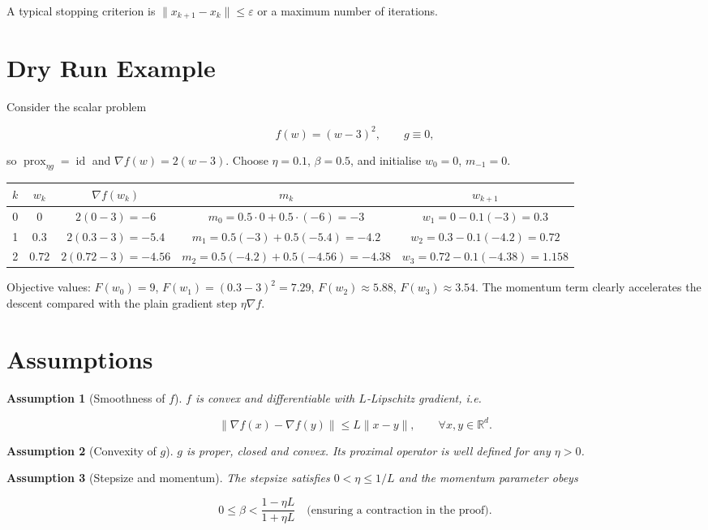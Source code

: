 \documentclass{article}
\newtheorem{assumption}{Assumption}
\newcommand{\prox}{\operatorname{prox}}
\newcommand{\R}{\mathbb{R}}
\begin{document}
A typical stopping criterion is $ \|x_{k+1}-x_{k}\|\leq \varepsilon$ or a maximum number of iterations.

\section*{Dry Run Example}
Consider the scalar problem  

\[
f(w)=(w-3)^{2},\qquad g\equiv0,
\]

so $\prox_{\eta g}= \operatorname{id}$ and $\nabla f(w)=2(w-3)$.  
Choose $\eta=0.1$, $\beta=0.5$, and initialise $w_{0}=0$, $m_{-1}=0$.

\begin{center}
\begin{tabular}{c|c|c|c|c}
$k$ & $w_{k}$ & $\nabla f(w_{k})$ & $m_{k}$ & $w_{k+1}$ \\ \hline
0 & $0$ & $2(0-3)=-6$ & $m_{0}=0.5\cdot0+0.5\cdot(-6)=-3$ & $w_{1}=0-0.1(-3)=0.3$\\[4pt]
1 & $0.3$ & $2(0.3-3)=-5.4$ & $m_{1}=0.5(-3)+0.5(-5.4)=-4.2$ & $w_{2}=0.3-0.1(-4.2)=0.72$\\[4pt]
2 & $0.72$ & $2(0.72-3)=-4.56$ & $m_{2}=0.5(-4.2)+0.5(-4.56)=-4.38$ & $w_{3}=0.72-0.1(-4.38)=1.158$\\
\end{tabular}
\end{center}

Objective values: $F(w_{0})=9$, $F(w_{1})=(0.3-3)^{2}=7.29$, $F(w_{2})\approx5.88$, $F(w_{3})\approx3.54$.  
The momentum term clearly accelerates the descent compared with the plain gradient step $\eta\nabla f$.

\newpage
\section*{Assumptions}
\begin{assumption}[Smoothness of $f$]\label{as:smooth}
$f$ is convex and differentiable with $L$‑Lipschitz gradient, i.e.  

\[
\|\nabla f(x)-\nabla f(y)\|\le L\|x-y\|,\qquad\forall x,y\in\R^{d}.
\]
\end{assumption}

\begin{assumption}[Convexity of $g$]\label{as:convex}
$g$ is proper, closed and convex. Its proximal operator is well defined for any $\eta>0$.
\end{assumption}

\begin{assumption}[Stepsize and momentum]\label{as:params}
The stepsize satisfies $0<\eta\le 1/L$ and the momentum parameter obeys  

\[
0\le\beta<\frac{1-\eta L}{1+\eta L}\quad\text{(ensuring a contraction in the proof).}
\]
\end{assumption}
\end{document}
